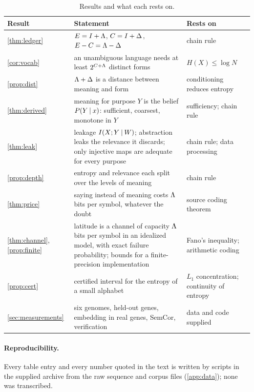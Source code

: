 \begin{table}[tbp]
\caption{Results and what each rests on.}\label{tab:results}
\small
\begin{tabular}{@{}p{2.6cm}>{\raggedright\arraybackslash}p{7.3cm}>{\raggedright\arraybackslash}p{4.1cm}@{}}
\toprule
Result & Statement & Rests on \\
\midrule
\cref{thm:ledger} & $E=I+\Lambda$, $C=I+\Delta$, $E-C=\Lambda-\Delta$ & chain rule \\
\cref{cor:vocab} & an unambiguous language needs at least $2^{C+\Lambda}$ distinct forms & $H(X)\le\log N$ \\
\cref{prop:dist} & $\Lambda+\Delta$ is a distance between meaning and form & conditioning reduces entropy \\
\cref{thm:derived} & meaning for purpose $Y$ is the belief $P(Y\mathbin{\vert} x)$: sufficient, coarsest, monotone in $Y$ & sufficiency; chain rule \\
\cref{thm:leak} & leakage $I(X;Y\mathbin{\vert} W)$; abstraction leaks the relevance it discards; only injective maps are adequate for every purpose & chain rule; data processing \\
\cref{prop:depth} & entropy and relevance each split over the levels of meaning & chain rule \\
\cref{thm:price} & saying instead of meaning costs $\Lambda$ bits per symbol, whatever the doubt & source coding theorem \\
\cref{thm:channel}, \cref{prop:finite} & latitude is a channel of capacity $\Lambda$ bits per symbol in an idealized model, with exact failure probability; bounds for a finite-precision implementation & Fano's inequality; arithmetic coding \\
\cref{prop:cert} & certified interval for the entropy of a small alphabet & $L_1$ concentration; continuity of entropy \\
\cref{sec:measurements} & six genomes, held-out genes, embedding in real genes, SemCor, verification & data and code supplied \\
\bottomrule
\end{tabular}
\end{table}

\paragraph{Reproducibility.} Every table entry and every number quoted in the text is written by scripts in the supplied archive from the raw sequence and corpus files (\cref{app:data}); none was transcribed.
